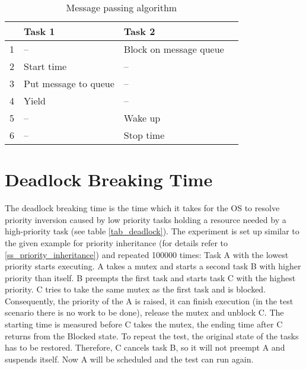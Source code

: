 \begin{table}[htbp]
	\centering
		\begin{tabular}{|l|l|l|l|}
			\hline
				& Task 1 							 & Task 2 								\\
				\hline 
				1 & --									 & Block on message queue	\\
			  2 & Start time		 			 & --											\\
			  3 & Put message to queue & --											\\
			  4 & Yield								 & --											\\
			  5 & --									 & Wake up								\\
			  6 & --									 & Stop time							\\	  
			\hline
		\end{tabular}
	\caption{Message passing algorithm}
	\label{tab_message_passing}
\end{table}

\section{Deadlock Breaking Time}
The deadlock breaking time is the time which it takes for the \ac{OS} to resolve priority inversion caused by low priority tasks holding a resource needed by a high-priority task (see table \ref{tab_deadlock}). 
The experiment is set up similar to the given example for priority inheritance (for details refer to \ref{ss_priority_inheritance}) and repeated 100000 times: 
Task A with the lowest priority starts executing.
A takes a mutex and starts a second task B with higher priority than itself.
B preempts the first task and starts task C with the highest priority. 
C tries to take the same mutex as the first task and is blocked.
Consequently, the priority of the A is raised, it can finish execution (in the test scenario there is no work to be done), release the mutex and unblock C.
The starting time is measured before C takes the mutex, the ending time after C returns from the Blocked state.
To repeat the test, the original state of the tasks has to be restored.
Therefore, C cancels task B, so it will not preempt A and suspends itself.
Now A will be scheduled and the test can run again.

